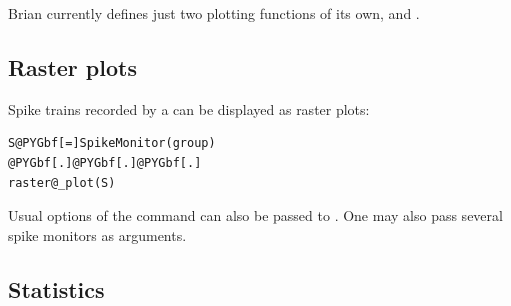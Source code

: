 \documentclass[letterpaper,10pt,english]{manual}
\begin{document}
Brian currently defines just two plotting functions of its own,
\hyperlink{brian.raster_plot}{} and \hyperlink{brian.hist_plot}{}.


\subsection{Raster plots}

Spike trains recorded by a \hyperlink{brian.SpikeMonitor}{} can be displayed as raster plots:

\begin{Verbatim}[commandchars=@\[\]]
S@PYGbf[=]SpikeMonitor(group)
@PYGbf[.]@PYGbf[.]@PYGbf[.]
raster@_plot(S)
\end{Verbatim}

Usual options of the  command can also be passed to \hyperlink{brian.raster_plot}{}. One may also pass
several spike monitors as arguments.


\subsection{Statistics}
\end{document}
